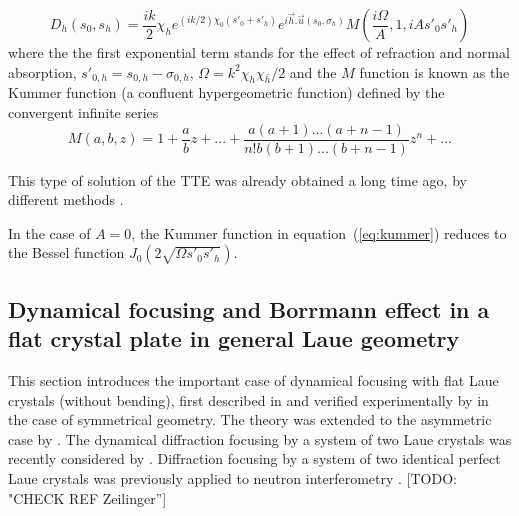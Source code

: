 \documentclass[preprint]{iucr}              %
\newcommand{\todo}[1]{{\color{red}[TODO: "#1'']}}
\newcommand{\inblue}[1]{{\color{blue}#1}}
\newcommand{\inred}[1]{{\color{red}#1}}
\begin{document}
  
\begin{equation}
\label{eq:kummer}
    D_h(s_0,s_h) = \frac{i k }{2} \chi_h e^{(ik/2) \chi_0 (s'_0 + s'_h)} e^{i \vec h . \vec u (s_0,\sigma_h)} M(\frac{i\Omega}{A},1,iA s'_0 s'_h)
\end{equation}
where the \inblue{the first exponential term stands for the effect of refraction and normal absorption, $s'_{0,h}=s_{0,h}-\sigma_{0,h}$, $\Omega=k^2\chi_h\chi_{\bar{h}}/2$ and the $M$ function is known as } the Kummer function (a confluent hypergeometric function) defined by the convergent infinite series
\begin{equation}
\label{eq:kummerSeries}
    M(a,b,z) = 1 + \frac{a}{b} z + 
    ... + \frac{a(a+1)...(a+n-1)}{n! b (b+1)...(b+n-1)}z^n+...
\end{equation}

This type of solution of the TTE was already obtained a long time ago, by different methods \cite{Petrashen1974,Katagawa1974,Litzmann1974,Chukhovski1977}.


In the case of $A=0$, the Kummer function in equation~(\ref{eq:kummer}) reduces to the Bessel function $J_0(2\sqrt{\Omega s'_0 s'_h})$. 
          
\subsection{Dynamical focusing and Borrmann effect in a flat crystal plate in general Laue geometry}
\label{sec:LaueFlat}

\inred{
This section introduces the important case of dynamical focusing with flat Laue crystals (without bending), first described in \cite{AfanasevKohn1977} and verified experimentally by \cite{Aristov1978, Aristov1980}
in the case of symmetrical geometry. The theory was extended to the asymmetric case by \cite{Kohn2000}. The dynamical diffraction focusing by a system of two Laue crystals was recently considered by \cite{KohnSmirnova}. Diffraction focusing by a system of two identical perfect Laue crystals was previously applied to neutron interferometry \cite{Zeilinger}}. \todo{CHECK REF Zeilinger}
\end{document}
